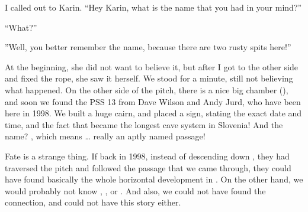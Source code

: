 I called out to Karin. ``Hey Karin, what is the name that you had in your mind?''

``What?''

''Well, you better remember the name, because
there are two rusty spits here!''

At the beginning, she did not want to
believe it, but after I got to the other side and fixed the rope, she
saw it herself. We stood for a minute, still not believing what
happened. On the other side of the pitch, there is a nice big chamber
(), and soon we found the PSS 13 from Dave Wilson and
Andy Jurd, who have been here in 1998. We built a huge cairn, and placed
a sign, stating the exact date and time, and the fact that  became the longest cave system in Slovenia! And the name?
, which means \ldots{}
really an aptly named passage!




Fate is a strange thing. If back in 1998, instead of descending down
, they had traversed the pitch and followed the passage
that we came through, they could have found basically the whole
horizontal development in . On the other hand, we would
probably not know , , or .
And also, we could not have found the connection, and could not have
this story either.

